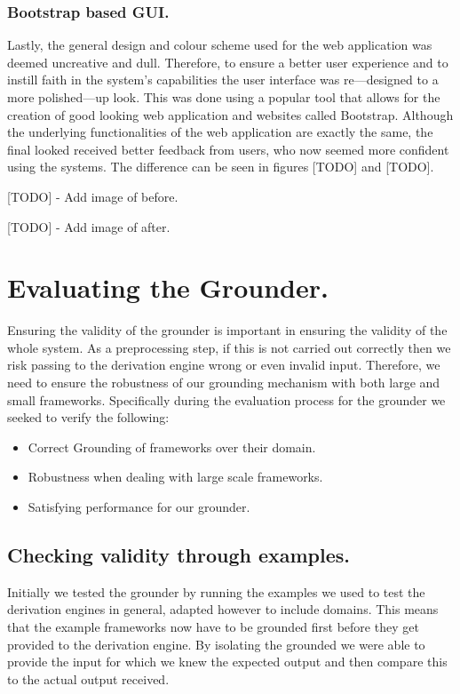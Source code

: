 \subsubsection{Bootstrap based GUI.}
Lastly, the general design and colour scheme used for the web application was deemed uncreative and dull. Therefore, to ensure a better user experience and to instill faith in the system's capabilities the user interface was re---designed to a more polished---up look. This was done using a popular tool that allows for the creation of good looking web application and websites called Bootstrap. Although the underlying functionalities of the web application are exactly the same, the final looked received better feedback from users, who now seemed more confident using the systems. The difference can be seen in figures [TODO] and [TODO].

[TODO] - Add image of before.

[TODO] - Add image of after.

\section{Evaluating the Grounder.}
Ensuring the validity of the grounder is important in ensuring the validity of the whole system. As a preprocessing step, if this is not carried out correctly then we risk passing to the derivation engine wrong or even invalid input. Therefore, we need to ensure the robustness of our grounding mechanism with both large and small frameworks. Specifically during the evaluation process for the grounder we seeked to verify the following:

\begin{itemize}
\item Correct Grounding of frameworks over their domain.
\item Robustness when dealing with large scale frameworks.
\item Satisfying performance for our grounder.
\end{itemize}

\subsection{Checking validity through examples.}
Initially we tested the grounder by running the examples we used to test the derivation engines in general, adapted however to include domains. This means that the example frameworks now have to be grounded first before they get provided to the derivation engine. By isolating the grounded we were able to provide the input for which we knew the expected output and then compare this to the actual output received. 

